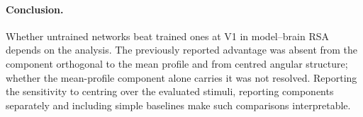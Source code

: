 \paragraph{Conclusion.}
Whether untrained networks beat trained ones at V1 in model--brain RSA depends on the
analysis. The previously reported advantage \citep{evalres} was absent from the component orthogonal to the mean profile and from centred angular structure; whether the mean-profile component alone carries it was not resolved. Reporting the sensitivity to centring over the evaluated stimuli, reporting components separately and including simple baselines make such comparisons interpretable.
